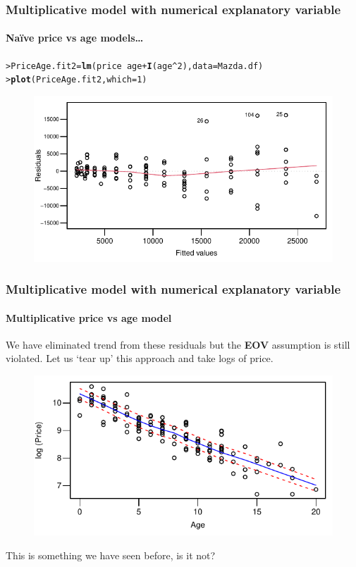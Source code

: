 \documentclass{beamer}\usepackage[]{graphicx}\usepackage[]{xcolor}
\makeatletter
\newcommand{\hlnum}[1]{\textcolor[rgb]{0.686,0.059,0.569}{#1}}%
\newcommand{\hlopt}[1]{\textcolor[rgb]{0,0,0}{#1}}%
\newcommand{\hlstd}[1]{\textcolor[rgb]{0.345,0.345,0.345}{#1}}%
\newcommand{\hlkwb}[1]{\textcolor[rgb]{0.69,0.353,0.396}{#1}}%
\newcommand{\hlkwc}[1]{\textcolor[rgb]{0.333,0.667,0.333}{#1}}%
\newcommand{\hlkwd}[1]{\textcolor[rgb]{0.737,0.353,0.396}{\textbf{#1}}}%
\newenvironment{kframe}{%
 \def\at@end@of@kframe{}%
 \ifinner\ifhmode%
  \def\at@end@of@kframe{\end{minipage}}%
  \begin{minipage}{\columnwidth}%
 \fi\fi%
 \def\FrameCommand##1{\hskip\@totalleftmargin \hskip-\fboxsep
 \colorbox{shadecolor}{##1}\hskip-\fboxsep
     \hskip-\linewidth \hskip-\@totalleftmargin \hskip\columnwidth}%
 \MakeFramed {\advance\hsize-\width
   \@totalleftmargin\z@ \linewidth\hsize
   \@setminipage}}%
 {\par\unskip\endMakeFramed%
 \at@end@of@kframe}
\newenvironment{knitrout}{}{} %
\makeatother
\begin{document}
\begin{frame}[fragile]
\frametitle{Multiplicative model with numerical explanatory variable}
\framesubtitle{Na\"ive price vs age models\ldots}
\begin{knitrout}\scriptsize
{}\color{fgcolor}\begin{kframe}
\begin{alltt}
\hlstd{> }\hlstd{PriceAge.fit2}\hlkwb{=}\hlkwd{lm}\hlstd{(price}\hlopt{~}\hlstd{age}\hlopt{+}\hlkwd{I}\hlstd{(age}\hlopt{^}\hlnum{2}\hlstd{),} \hlkwc{data}\hlstd{=Mazda.df)}
\hlstd{> }\hlkwd{plot}\hlstd{(PriceAge.fit2,}\hlkwc{which}\hlstd{=}\hlnum{1}\hlstd{)}
\end{alltt}
\end{kframe}
\end{knitrout}



\begin{figure}
  \centering
  \includegraphics{figure/RC-H06-026}
\end{figure}

\end{frame}


\begin{frame}[fragile]
\frametitle{Multiplicative model with numerical explanatory variable}
\framesubtitle{Multiplicative price vs age model}
We have eliminated trend from these residuals but the \textbf{EOV} assumption is still violated.
Let us `tear up' this approach and take logs of price.



\begin{figure}
  \centering
  \includegraphics{figure/RC-H06-027}
\end{figure}

This is something we have seen before, is it not?
\end{frame}
\end{document}
